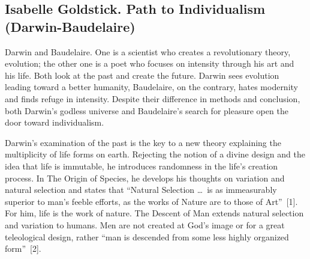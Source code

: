
\subsection*{Isabelle Goldstick. Path to Individualism (Darwin-Baudelaire)}  


\begin{multicols}{2}
Darwin and Baudelaire. One is a scientist who creates a revolutionary theory, evolution; the other one is a poet who focuses on intensity through his art and his life.
Both look at the past and create the future. Darwin sees evolution leading toward a better humanity, Baudelaire, on the contrary, hates modernity and finds refuge in
intensity. Despite their difference in methods and conclusion, both Darwin's godless universe and Baudelaire's search for pleasure open the door toward individualism.

Darwin’s examination of the past is the key to a new theory explaining the multiplicity of life forms on earth. Rejecting the notion of a divine design and the
idea that life is immutable, he introduces randomness in the life’s creation process. In The Origin of Species, he develops his thoughts on variation and 
natural selection and states that ``Natural Selection \dots\ is as immeasurably superior to man's feeble efforts, as the works of Nature are to those of Art''~[1].
For him, life is the work of nature. The Descent of Man extends natural selection and variation to humans. Men are not created at God’s image or for a great
teleological design, rather “man is descended from some less highly organized form”~[2].


\end{multicols}
